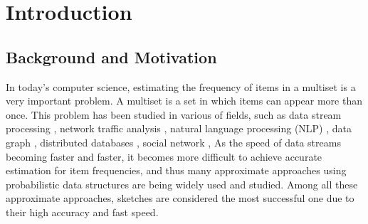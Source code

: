 \presec
\section{Introduction} \postsec

\presub
\subsection{Background and Motivation} \postsub

In today's computer science, estimating the frequency of items in a multiset is a very important problem.
A multiset is a set in which items can appear more than once.
This problem has been studied in various of fields, such as data stream processing \cite{charikar2002finding,aggarwal2010on,manerikar2009frequent,thomas2009on}, network traffic analysis \cite{liu2016one,chen2010tracking}, natural language processing (NLP) \cite{goyal2012sketch,goyal2009streaming}, data graph \cite{zhao2011gsketch:}, distributed databases \cite{cormode2005sketching}, social network \cite{aggarwal2012event}, \etc
As the speed of data streams becoming faster and faster, it becomes more difficult to achieve accurate estimation for item frequencies, and thus many approximate approaches using probabilistic data structures are being widely used and studied.
Among all these approximate approaches, sketches \cite{sketchsurvey} are considered the most successful one due to their high accuracy and fast speed.


